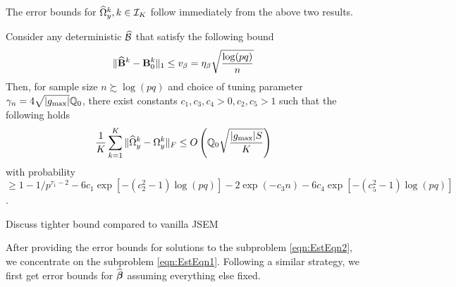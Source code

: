 The error bounds for $\widehat \Omega_y^k, k \in {\cal{I}}_K$ follow immediately from the above two results.

\begin{Corollary}\label{corollary:OmegaCorollary}
Consider any deterministic $\widehat {{\cal{B}}}$ that satisfy the following bound
%
$$
\| \widehat {{\mathbf{B}}}^k - {\mathbf{B}}_0^k \|_1 \leq v_\beta = \eta_\beta \sqrt{ \frac{ \log(pq)}{n}}
$$
%
Then, for sample size $n \succsim \log (pq)$ and choice of tuning parameter $\gamma_n = 4 \sqrt{| g_{\max}|} {\mathbb{Q}}_0$, there exist constants $ c_1, c_3, c_4 > 0, c_2, c_5 > 1$ such that the following holds
%
\begin{align}\label{eqn:OmegaBounds}
\frac{1}{K} \sum_{k=1}^K \| \widehat \Omega_y^k - \Omega_y^k \|_F \leq
O \left( {\mathbb{Q}}_0 \sqrt{\frac{| g_{\max}| S}{K}} \right)
\end{align}
%
with probability $\geq 1 - 1/p^{\tau_1-2} - 6c_1 \exp [-(c_2^2-1) \log(pq)] - 2 \exp (- c_3 n) - 6c_4 \exp [-(c_5^2-1) \log(pq)]$.

\end{Corollary}

{\colrbf Discuss tighter bound compared to vanilla JSEM}

After providing the error bounds for solutions to the subproblem \eqref{eqn:EstEqn2}, we concentrate on the subproblem \eqref{eqn:EstEqn1}. Following a similar strategy, we first get error bounds for $\widehat {{\boldsymbol{\beta}}}$ assuming everything else fixed.

